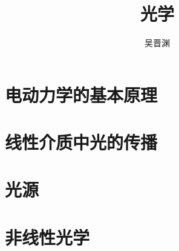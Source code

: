 \documentclass[UTF8, a4paper]{ctexbook}
\title{光学}
\author{吴晋渊}
\numberwithin{equation}{chapter}
\begin{document}
\maketitle

\part{电动力学的基本原理}



\part{线性介质中光的传播}







\part{光源}\label{part:source}



\part{非线性光学}








 
\end{document}
